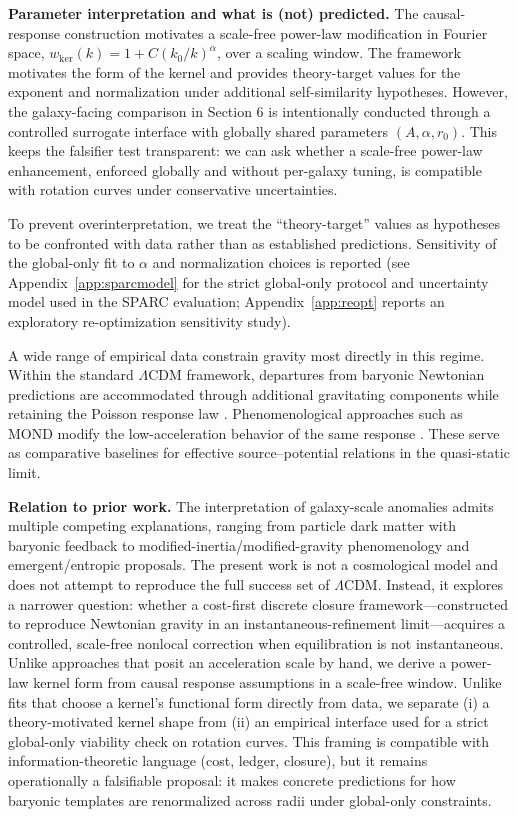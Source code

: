 \documentclass[entropy,article,submit,pdftex,moreauthors]{Definitions/mdpi}
\begin{document}
\textbf{Parameter interpretation and what is (not) predicted.} The causal-response construction motivates a scale-free power-law modification in Fourier space,
$w_{\mathrm{ker}}(k)=1+C(k_0/k)^\alpha$, over a scaling window. The framework motivates the form of the kernel and provides theory-target values for the exponent and normalization under additional self-similarity hypotheses. However, the galaxy-facing comparison in Section 6 is intentionally conducted through a controlled surrogate interface with globally shared parameters $(A, \alpha, r_0)$. This keeps the falsifier test transparent: we can ask whether a scale-free power-law enhancement, enforced globally and without per-galaxy tuning, is compatible with rotation curves under conservative uncertainties.

To prevent overinterpretation, we treat the “theory-target” values as hypotheses to be confronted with data rather than as established predictions. Sensitivity of the global-only fit to $\alpha$ and normalization choices is reported (see Appendix~\ref{app:sparcmodel} for the strict global-only protocol and uncertainty model used in the SPARC evaluation; Appendix~\ref{app:reopt} reports an exploratory re-optimization sensitivity study).

A wide range of empirical data constrain gravity most directly in this regime. Within the standard $\Lambda$CDM framework, departures from baryonic Newtonian predictions are accommodated through additional gravitating components while retaining the Poisson response law \cite{bullock2017}. Phenomenological approaches such as MOND modify the low-acceleration behavior of the same response \cite{milgrom1983,mcgaugh2016}. These serve as comparative baselines for effective source--potential relations in the quasi-static limit.

\textbf{Relation to prior work.} The interpretation of galaxy-scale anomalies admits multiple competing explanations, ranging from particle dark matter with baryonic feedback to modified-inertia/modified-gravity phenomenology and emergent/entropic proposals. The present work is not a cosmological model and does not attempt to reproduce the full success set of $\Lambda$CDM. Instead, it explores a narrower question: whether a cost-first discrete closure framework—constructed to reproduce Newtonian gravity in an instantaneous-refinement limit—acquires a controlled, scale-free nonlocal correction when equilibration is not instantaneous.
Unlike approaches that posit an acceleration scale by hand, we derive a power-law kernel form from causal response assumptions in a scale-free window. Unlike fits that choose a kernel’s functional form directly from data, we separate (i) a theory-motivated kernel shape from (ii) an empirical interface used for a strict global-only viability check on rotation curves. This framing is compatible with information-theoretic language (cost, ledger, closure), but it remains operationally a falsifiable proposal: it makes concrete predictions for how baryonic templates are renormalized across radii under global-only constraints.
\end{document}
